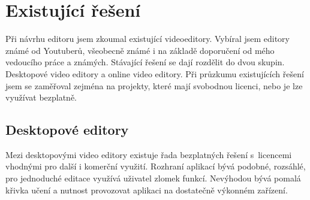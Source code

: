\chapter{Existující řešení}
Při návrhu editoru jsem zkoumal existující videoeditory. Vybíral jsem editory známé od Youtuberů, všeobecně známé i na základě doporučení od mého vedoucího práce a známých. Stávající řešení se dají rozdělit do dvou skupin. Desktopové video editory a online video editory. Při průzkumu existujících řešení jsem se zaměřoval zejména na projekty, které mají svobodnou licenci, nebo je lze využívat bezplatně.

\section{Desktopové editory}
Mezi desktopovými video editory existuje řada bezplatných řešení s~licencemi vhodnými pro další i komerční využití. Rozhraní aplikací bývá podobné, rozsáhlé, pro jednoduché editace využívá uživatel zlomek funkcí. Nevýhodou bývá pomalá křivka učení a nutnost provozovat aplikaci na dostatečně výkonném zařízení.

